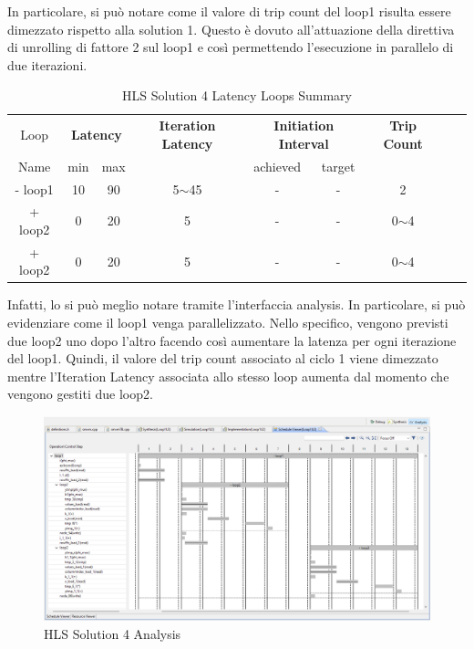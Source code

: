 In particolare, si può notare come il valore di trip count del loop1 risulta essere dimezzato rispetto alla solution 1. Questo è dovuto all'attuazione della direttiva  di unrolling di fattore 2 sul loop1 e così permettendo l'esecuzione in parallelo di due iterazioni.

\begin{table}[H]
	\centering
	\begin{tabular}{|c|c|c|c|c|c|c|c|c|}
		\hline
		\multicolumn{1}{|c|}{Loop} & \multicolumn{2}{|c|}{\textbf{Latency}} & \multicolumn{1}{c|}{\textbf{Iteration Latency}} & \multicolumn{2}{c|}{\textbf{Initiation Interval}} & \multicolumn{1}{c|}{\textbf{Trip Count}}  \\
		Name & min & max &  & achieved & target &  \\
		\hline
		- loop1 & 10 & 90 & 5$\sim$45 & - & - & 2 \\
		+ loop2 & 0 & 20 & 5 & - & - & 0$\sim$4 \\
		+ loop2 & 0 & 20 & 5 & - & - & 0$\sim$4 \\
		\hline
	\end{tabular}
	\caption{HLS Solution 4 Latency Loops Summary}
	\label{tab:hls-solution-4-loop-summary}
\end{table}

Infatti, lo si può meglio notare tramite l'interfaccia analysis. In particolare, si può evidenziare come il loop1 venga parallelizzato. Nello specifico, vengono previsti due loop2 uno dopo l'altro facendo così aumentare la latenza per ogni iterazione del loop1. Quindi, il valore del trip count associato al ciclo 1 viene dimezzato mentre l'Iteration Latency associata allo stesso loop aumenta dal momento che vengono gestiti due loop2.

\begin{figure}[H]
	\centering
	\includegraphics[width=1\textwidth]{solutions/s4/s4analysis.png}
	\caption{HLS Solution 4 Analysis}
\end{figure}

